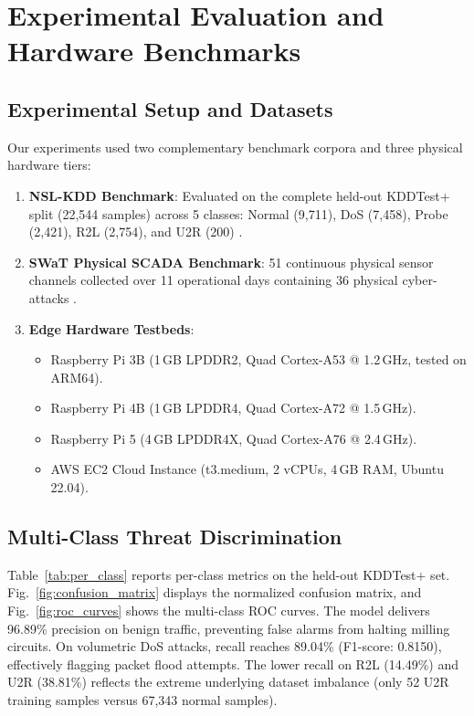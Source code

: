 \documentclass[conference]{IEEEtran}
\begin{document}
\section{Experimental Evaluation and Hardware Benchmarks}

\subsection{Experimental Setup and Datasets}
Our experiments used two complementary benchmark corpora and three physical hardware tiers:
\begin{enumerate}
    \item \textbf{NSL-KDD Benchmark}: Evaluated on the complete held-out KDDTest+ split (22,544 samples) across 5 classes: Normal (9,711), DoS (7,458), Probe (2,421), R2L (2,754), and U2R (200) \cite{tavallaee2009detailed}.
    \item \textbf{SWaT Physical SCADA Benchmark}: 51 continuous physical sensor channels collected over 11 operational days containing 36 physical cyber-attacks \cite{goh2016dataset}.
    \item \textbf{Edge Hardware Testbeds}:
    \begin{itemize}
        \item Raspberry Pi 3B (1\,GB LPDDR2, Quad Cortex-A53 @ 1.2\,GHz, tested on ARM64).
        \item Raspberry Pi 4B (1\,GB LPDDR4, Quad Cortex-A72 @ 1.5\,GHz).
        \item Raspberry Pi 5 (4\,GB LPDDR4X, Quad Cortex-A76 @ 2.4\,GHz).
        \item AWS EC2 Cloud Instance (t3.medium, 2 vCPUs, 4\,GB RAM, Ubuntu 22.04).
    \end{itemize}
\end{enumerate}

\subsection{Multi-Class Threat Discrimination}
Table~\ref{tab:per_class} reports per-class metrics on the held-out KDDTest+ set. Fig.~\ref{fig:confusion_matrix} displays the normalized confusion matrix, and Fig.~\ref{fig:roc_curves} shows the multi-class ROC curves. The model delivers 96.89\% precision on benign traffic, preventing false alarms from halting milling circuits. On volumetric DoS attacks, recall reaches 89.04\% (F1-score: 0.8150), effectively flagging packet flood attempts. The lower recall on R2L (14.49\%) and U2R (38.81\%) reflects the extreme underlying dataset imbalance (only 52 U2R training samples versus 67,343 normal samples).
\end{document}
